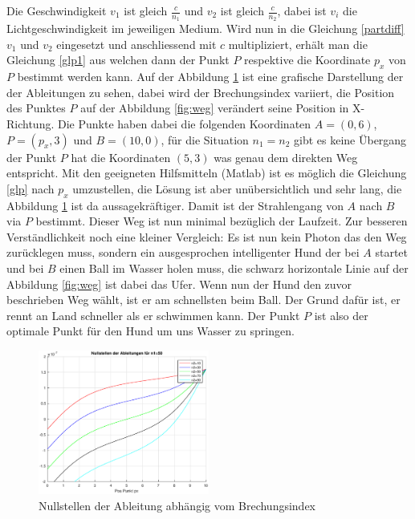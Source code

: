 \begin{refsection}
Die Geschwindigkeit $ v_{1}$ ist gleich $\frac{c}{n_{1}} $ und $ v_{2}$ ist gleich $\frac{c}{n_{2}}$, dabei ist $v_{i}$ die Lichtgeschwindigkeit im jeweiligen Medium. Wird nun in die Gleichung \eqref{partdiff} $ v_{1}$ und $ v_{2}$ eingesetzt und anschliessend mit $c$ multipliziert, erhält man die Gleichung \eqref{glp1} aus welchen dann der Punkt $P$ respektive die Koordinate $p_{x}$ von $P$ bestimmt werden kann.
Auf der Abbildung \ref{fig:nullstelle} ist eine grafische Darstellung der der Ableitungen zu sehen, dabei wird der Brechungsindex variiert, die Position des Punktes $P$ auf der Abbildung \ref{fig:weg} verändert seine Position in X-Richtung. Die  Punkte haben dabei die folgenden Koordinaten $A = (0,6)$, $P=(p_{x},3)$ und $B=(10,0)$, für die Situation $n_{1}=n_{2}$ gibt es keine Übergang der Punkt $P$ hat die Koordinaten $(5,3)$ was genau dem direkten Weg entspricht. Mit den geeigneten Hilfsmitteln (Matlab) ist es möglich die Gleichung \eqref{glp} nach $p_{x}$ umzustellen, die Lösung ist aber unübersichtlich und sehr lang, die Abbildung \ref{fig:nullstelle} ist da aussagekräftiger.
Damit ist der Strahlengang von $A$ nach $B$ via $P$ bestimmt. Dieser Weg ist nun minimal bezüglich der Laufzeit. \newline
Zur besseren Verständlichkeit noch eine kleiner Vergleich:\newline
Es ist nun kein Photon das den Weg zurücklegen muss, sondern ein ausgesprochen intelligenter Hund der bei $A$ startet und bei $B$ einen Ball im Wasser holen muss, die schwarz horizontale Linie auf der Abbildung \ref{fig:weg} ist dabei das Ufer. Wenn nun der Hund den zuvor beschrieben Weg wählt, ist er am schnellsten beim Ball. Der Grund dafür ist, er rennt an Land schneller als er schwimmen kann. Der Punkt $P$ ist also der optimale Punkt für den Hund um uns Wasser zu springen.
\begin{figure}
  \centering
  \includegraphics[width=0.5\textwidth]{adaptiv/images/Nullstellen}
  \caption{Nullstellen der Ableitung abhängig vom Brechungsindex}
  \label{fig:nullstelle}
\end{figure}


\end{refsection}

